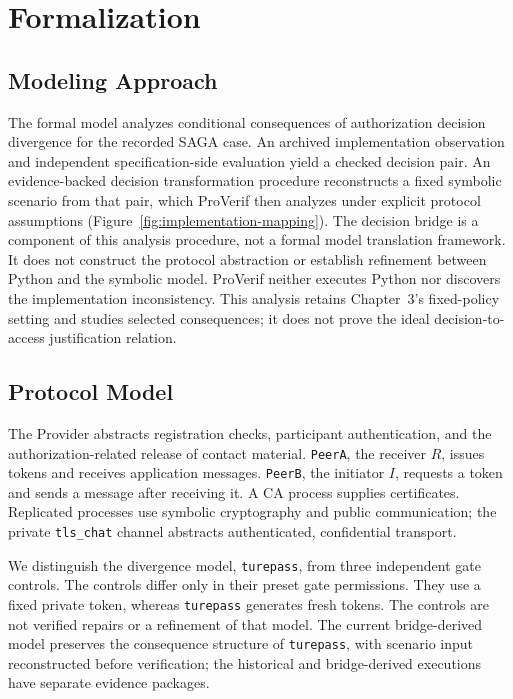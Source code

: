 \section{Formalization}
\label{sec:formalization}

\subsection{Modeling Approach}

The formal model analyzes conditional consequences of authorization decision
divergence for the recorded SAGA case. An archived implementation observation
and independent specification-side evaluation yield a checked decision pair.
An evidence-backed decision transformation procedure reconstructs a fixed
symbolic scenario from that pair, which ProVerif then analyzes under explicit
protocol assumptions (Figure~\ref{fig:implementation-mapping}). The decision
bridge is a component of this analysis procedure, not a formal model
translation framework. It does not construct the protocol abstraction or
establish refinement between Python and the symbolic model. ProVerif neither
executes Python nor discovers the implementation inconsistency. This analysis
retains Chapter~3's fixed-policy setting and studies selected consequences;
it does not prove the ideal decision-to-access justification relation.


\subsection{Protocol Model}

The Provider abstracts registration checks, participant authentication, and
the authorization-related release of contact material. \texttt{PeerA}, the
receiver $R$, issues tokens and receives application messages.
\texttt{PeerB}, the initiator $I$, requests a token and sends a message after
receiving it. A CA process supplies certificates. Replicated processes use
symbolic cryptography and public communication; the private
\texttt{tls\_chat} channel abstracts authenticated, confidential transport.

We distinguish the divergence model, \texttt{turepass}, from three independent
gate controls. The controls differ only in their preset gate permissions.
They use a fixed private token, whereas \texttt{turepass} generates fresh
tokens. The controls are not verified repairs or a refinement of that model.
The current bridge-derived model preserves the consequence structure of
\texttt{turepass}, with scenario input reconstructed before verification;
the historical and bridge-derived executions have separate evidence packages.

